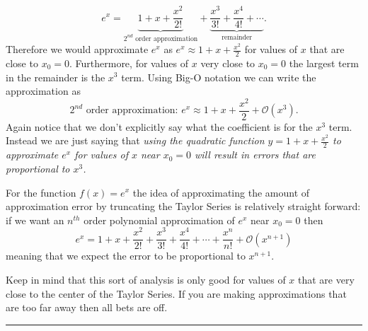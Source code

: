 \documentclass[
]{book}
\theoremstyle{definition}
\theoremstyle{definition}
\theoremstyle{definition}
\theoremstyle{remark}
\begin{document}
\begin{description}
\[ e^x = \underbrace{1 + x + \frac{x^2}{2!}}_{\text{$2^{nd}$ order approximation}} + \underbrace{\frac{x^3}{3!} + \frac{x^4}{4!} + \cdots}_{\text{remainder}}. \]
Therefore we would approximate \(e^x\) as \(e^x \approx 1+x+\frac{x^2}{2}\) for values of \(x\) that are close to \(x_0 = 0\). Furthermore, for values of \(x\) very close to \(x_0 = 0\) the largest term in the remainder is the \(x^3\) term. Using Big-O notation we can write the approximation as
\[ \text{$2^{nd}$ order approximation: } e^x \approx 1 + x + \frac{x^2}{2} + \mathcal{O}(x^3). \]
Again notice that we don't explicitly say what the coefficient is for the \(x^3\) term. Instead we are just saying that \emph{using the quadratic function \(y=1+x+\frac{x^2}{2}\) to approximate \(e^x\) for values of \(x\) near \(x_0=0\) will result in errors that are proportional to \(x^3\).}
\end{description}

For the function \(f(x) = e^x\) the idea of approximating the amount of approximation error by truncating the Taylor Series is relatively straight forward: if we want an \(n^{th}\) order polynomial approximation of \(e^x\) near \(x_0 = 0\) then
\[ e^x = 1 + x + \frac{x^2}{2!} + \frac{x^3}{3!} + \frac{x^4}{4!} + \cdots + \frac{x^n}{n!} + \mathcal{O}(x^{n+1}) \]
meaning that we expect the error to be proportional to \(x^{n+1}\).

Keep in mind that this sort of analysis is only good for values of \(x\) that are very close to the center of the Taylor Series. If you are making approximations that are too far away then all bets are off.

\begin{center}\rule{0.5\linewidth}{0.5pt}\end{center}
\end{document}
